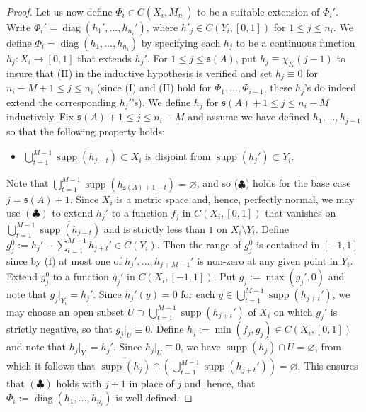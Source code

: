 \documentclass[12pt]{amsart}
\numberwithin{equation}{section}
\theoremstyle{definition}
\theoremstyle{remark}
\newcommand{\diag}{\operatorname{diag}}
\newcommand{\supp}{\operatorname{supp}}
\begin{document}
\begin{proof}
	Let us now define $\Phi_{i}\in C(X_{i},M_{n_{i}})$ to be a suitable extension of $\Phi_{i}'$. Write $\Phi_{i}'=\diag(h_{1}',\ldots,h_{n_{i}}')$, where $h'_{j}\in C(Y_{i},[0,1])$ for $1\leq j\leq n_{i}$. We define $\Phi_{i}=\diag(h_{1},\ldots,h_{n_{i}})$ by specifying each $h_{j}$ to be a continuous function $h_{j}\colon X_{i}\to [0,1]$ that extends $h_{j}'$. For $1\leq j\leq \mathfrak{s}(A)$, put $h_{j}\equiv \chi_{K}(j-1)$ to insure that (II) in the inductive hypothesis is verified and set $h_{j}\equiv 0$ for $n_{i}-M+1\leq j\leq n_{i}$ (since (I) and (II) hold for $\Phi_{1},\ldots,\Phi_{i-1}$, these $h_{j}$'s do indeed extend the corresponding $h_{j}'$'s). We define $h_{j}$ for $\mathfrak{s}(A)+1\leq j\leq n_{i}-M$ inductively. Fix $\mathfrak{s}(A)+1\leq j\leq n_{i}-M$ and assume we have defined $h_{1},\ldots,h_{j-1}$ so that the following property holds:
	\begin{itemize}
		\item[($\clubsuit$)] $\bigcup_{t=1}^{M-1}\overline{\supp(h_{j-t})}\subset X_{i}$ is disjoint from $\supp(h_{j}')\subset Y_{i}$.
	\end{itemize}
	Note that $\bigcup_{t=1}^{M-1}\overline{\supp(h_{\mathfrak{s}(A)+1-t})}=\varnothing$, and so ($\clubsuit$) holds for the base case $j=\mathfrak{s}(A)+1$. Since $X_{i}$ is a metric space and, hence, perfectly normal, we may use $(\clubsuit)$ to extend $h_{j}'$ to a function $f_{j}$ in $C(X_{i},[0,1])$ that vanishes on $\bigcup_{t=1}^{M-1}\overline{\supp(h_{j-t})}$ and is strictly less than $1$ on $X_{i}\setminus Y_{i}$. Define $g^{0}_{j}:=h_{j}'-\sum_{t=1}^{M-1}h_{j+t}'\in C(Y_{i})$. Then the range of $g_{j}^{0}$ is contained in $[-1,1]$ since by (I) at most one of $h_{j}',\ldots,h_{j+M-1}'$ is non-zero at any given point in $Y_{i}$. Extend $g_{j}^{0}$ to a function $g_{j}'$ in $C(X_{i},[-1,1])$. Put $g_{j}:=\max(g_{j}',0)$ and note that $g_{j}|_{Y_{i}}=h_{j}'$. Since $h_{j}'(y)=0$ for each $y\in \bigcup_{t=1}^{M-1}\supp(h_{j+t}')$, we may choose an open subset $U\supset \bigcup_{t=1}^{M-1}\supp(h_{j+t}')$ of $X_{i}$ on which $g_{j}'$ is strictly negative, so that $g_{j}|_{U}\equiv 0$. Define $h_{j}:=\min(f_{j},g_{j})\in C(X_{i},[0,1])$ and note that $h_{j}|_{Y_{i}}=h_{j}'$. Since $h_{j}|_{U}\equiv 0$, we have $\supp(h_{j})\cap U=\varnothing$, from which it follows that $\overline{\supp(h_{j})}\cap\left(\bigcup_{t=1}^{M-1}\supp(h_{j+t}')\right)=\varnothing$. This ensures that $(\clubsuit)$ holds with $j+1$ in place of $j$ and, hence, that $\Phi_{i}:=\diag(h_{1},\ldots,h_{n_{i}})$ is well defined. 
	

\end{proof}
\end{document}
